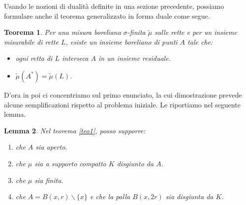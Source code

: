 \documentclass[a4paper, twoside,openright]{article}
\newcommand{\<}{\langle}
\renewcommand{\>}{\rangle}
\newtheorem{teo}{Teorema}[]
\newtheorem{lemma}[teo]{Lemma}
\begin{document}
Usando le nozioni di dualità definite in una sezione precedente, possiamo formulare anche il teorema generalizzato in forma duale come segue.

\begin{teo}
	Per una misura boreliana $\sigma$-finita $\tilde \mu$ sulle rette e per un insieme misurabile di rette $L$, esiste un insieme boreliano di punti $A$ tale che:
	\begin{itemize}
		\item ogni retta di $L$ interseca $A$ in un insieme residuale.
		\item $\tilde \mu\left(A^{*}\right)=\tilde \mu(L)$.
	\end{itemize}
\end{teo}

D'ora in poi ci concentriamo sul primo enunciato, la cui dimostrazione prevede alcune semplificazioni rispetto al problema iniziale. Le riportiamo nel seguente lemma.

\begin{lemma} \label{Aaperto}
	Nel teorema \ref{teo1}, posso supporre: 
	\begin{enumerate}
		\item che $A$ sia aperto.
		\item che $\mu$ sia a supporto compatto $K$ disgiunto da $A$.
		\item che $\mu$ sia finita.
		\item che $A=B(x, r) \backslash\{x\}$ e che la palla $B(x, 2 r)$ sia disgiunta da $K$.
	\end{enumerate}	
\end{lemma}
\end{document}
